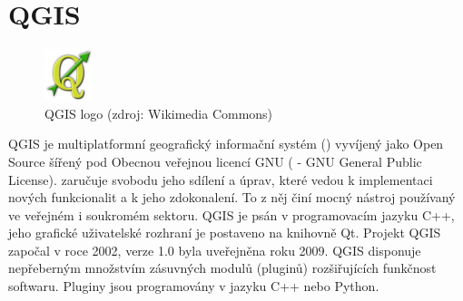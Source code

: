 \section{QGIS}

\begin{figure}[H]
    \centering
      \includegraphics[width=40pt]{./pictures/qgis.png}
      \caption[QGIS logo]{QGIS logo (zdroj: Wikimedia Commons)}
      \label{fig:qgis}
\end{figure}
 
QGIS je multiplatformní geografický informační systém () vyvíjený jako Open Source šířený pod Obecnou veřejnou licencí GNU ( - GNU General Public License).  zaručuje svobodu jeho sdílení a úprav, které vedou k implementaci nových funkcionalit a k jeho zdokonalení. To z něj činí mocný nástroj používaný ve veřejném i soukromém sektoru. QGIS je psán v programovacím jazyku C++, jeho grafické uživatelské rozhraní je postaveno na knihovně Qt. Projekt QGIS započal v roce 2002, verze 1.0 byla uveřejněna roku 2009. QGIS disponuje nepřeberným množstvím zásuvných modulů (pluginů) rozšiřujících funkčnost softwaru. Pluginy jsou programovány v jazyku C++ nebo Python. 




   